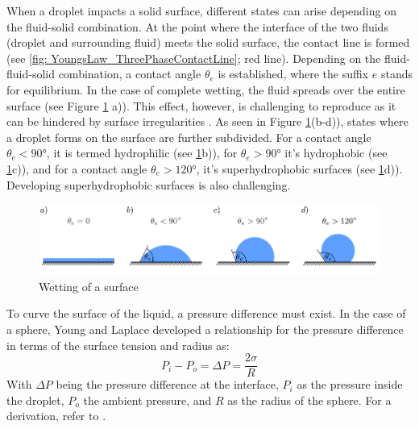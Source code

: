 When a droplet impacts a solid surface, different states can arise depending on the fluid-solid combination. At the point where the interface of the two fluids (droplet and surrounding fluid) meets the solid surface, the contact line is formed (see \ref{fig: YoungsLaw_ThreePhaseContactLine}; red line). Depending on the fluid-fluid-solid combination, a contact angle $\theta_e$ is established, where the suffix $e$ stands for equilibrium. In the case of complete wetting, the fluid spreads over the entire surface (see Figure \ref{fig: WettingTheory_WettingOfSurface} a)). This effect, however, is challenging to reproduce as it can be hindered by surface irregularities . As seen in Figure \ref{fig: WettingTheory_WettingOfSurface}(b-d)), states where a droplet forms on the surface are further subdivided. For a contact angle $\theta_e<90°$, it is termed hydrophilic (see \ref{fig: WettingTheory_WettingOfSurface}b)), for $\theta_e>90°$ it's hydrophobic (see \ref{fig: WettingTheory_WettingOfSurface}c)), and for a contact angle $\theta_e>120°$, it's superhydrophobic surfaces (see \ref{fig: WettingTheory_WettingOfSurface}d)). Developing superhydrophobic surfaces is also challenging.
\begin{figure}[h]
    \centering
    \includegraphics[width=.95\textwidth]{Pictures/DropletsAndWetting.pdf}
    \caption{Wetting of a surface}
    \label{fig: WettingTheory_WettingOfSurface}
\end{figure}
To curve the surface of the liquid, a pressure difference must exist. In the case of a sphere, Young and Laplace developed a relationship for the pressure difference in terms of the surface tension and radius as:
\begin{equation}
\label{eq: YoungLaplaceEQ}
    P_i - P_o = \Delta P =  \frac{2\sigma}{R}
\end{equation}
With $\Delta P$ being the pressure difference at the interface, $P_i$ as the pressure inside the droplet, $P_o$ the ambient pressure, and $R$ as the radius of the sphere. For a derivation, refer to \cite{buttPhysicsChemistryInterfaces}.
